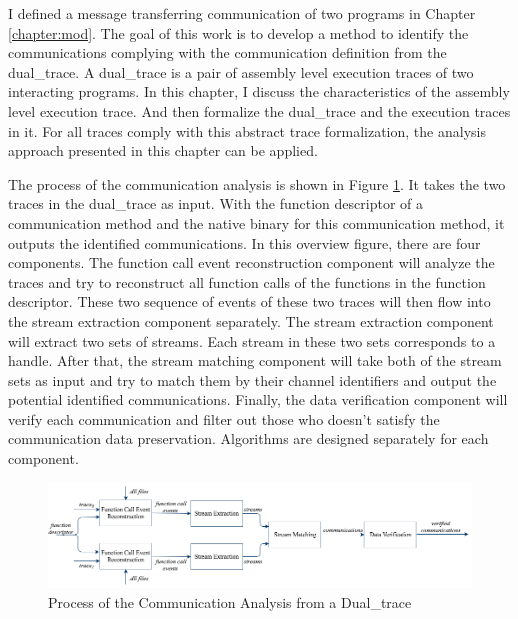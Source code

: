 


\label{chapter:alo}
I defined a message transferring communication of two programs in Chapter \ref{chapter:mod}. The goal of this work is to develop a method to identify the communications complying with the communication definition from the dual\_trace. A dual\_trace is a pair of assembly level execution traces of two interacting programs. In this chapter, I discuss the characteristics of the assembly level execution trace. And then formalize the dual\_trace and the execution traces in it. For all traces comply with this abstract trace formalization, the analysis approach presented in this chapter can be applied.

The process of the communication analysis is shown in Figure \ref{overview}. It takes the two traces in the dual\_trace as input. With the function descriptor of a communication method and the native binary for this communication method, it outputs the identified communications. In this overview figure, there are four components. The function call event reconstruction component will analyze the traces and try to reconstruct all function calls of the functions in the function descriptor. These two sequence of events of these two traces will then flow into the stream extraction component separately. The stream extraction component will extract two sets of streams. Each stream in these two sets corresponds to a handle. After that, the stream matching component will take both of the stream sets as input and try to match them by their channel identifiers and output the potential identified communications. Finally, the data verification component will verify each communication and filter out those who doesn't satisfy the communication data preservation. Algorithms are designed separately for each component.

\begin{figure}[H]
\centerline{\includegraphics[scale=0.55]{Figures/overview}}
\caption{Process of the Communication Analysis from a Dual\_trace}
\label{overview}
\end{figure}

